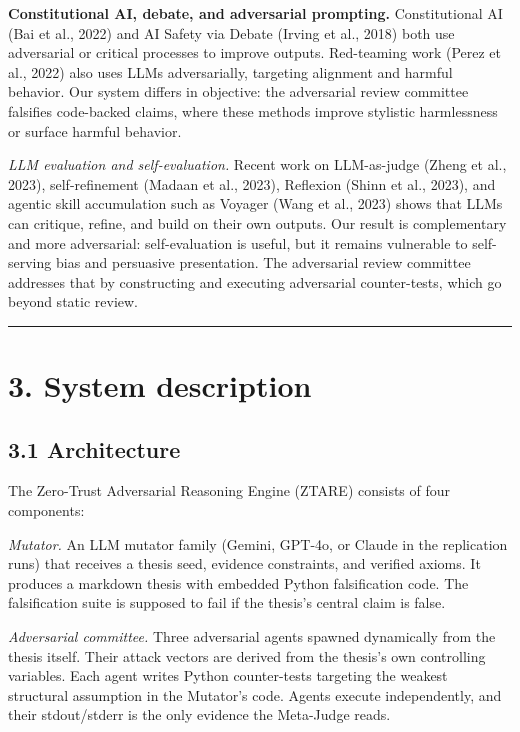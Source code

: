 \documentclass[
  11pt]{article}
\begin{document}
\textbf{Constitutional AI, debate, and adversarial prompting.}
Constitutional AI (Bai et al., 2022) and AI Safety via Debate (Irving et
al., 2018) both use adversarial or critical processes to improve
outputs. Red-teaming work (Perez et al., 2022) also uses LLMs
adversarially, targeting alignment and harmful behavior. Our system
differs in objective: the adversarial review committee falsifies
code-backed claims, where these methods improve stylistic harmlessness
or surface harmful behavior.

\emph{LLM evaluation and self-evaluation.} Recent work on LLM-as-judge
(Zheng et al., 2023), self-refinement (Madaan et al., 2023), Reflexion
(Shinn et al., 2023), and agentic skill accumulation such as Voyager
(Wang et al., 2023) shows that LLMs can critique, refine, and build on
their own outputs. Our result is complementary and more adversarial:
self-evaluation is useful, but it remains vulnerable to self-serving
bias and persuasive presentation. The adversarial review committee
addresses that by constructing and executing adversarial counter-tests,
which go beyond static review.

\begin{center}\rule{0.5\linewidth}{0.5pt}\end{center}

\section{3. System description}\label{system-description}

\subsection{3.1 Architecture}\label{architecture}

The Zero-Trust Adversarial Reasoning Engine (ZTARE) consists of four
components:

\emph{Mutator.} An LLM mutator family (Gemini, GPT-4o, or Claude in the
replication runs) that receives a thesis seed, evidence constraints, and
verified axioms. It produces a markdown thesis with embedded Python
falsification code. The falsification suite is supposed to fail if the
thesis's central claim is false.

\emph{Adversarial committee.} Three adversarial agents spawned
dynamically from the thesis itself. Their attack vectors are derived
from the thesis's own controlling variables. Each agent writes Python
counter-tests targeting the weakest structural assumption in the
Mutator's code. Agents execute independently, and their stdout/stderr is
the only evidence the Meta-Judge reads.
\end{document}
